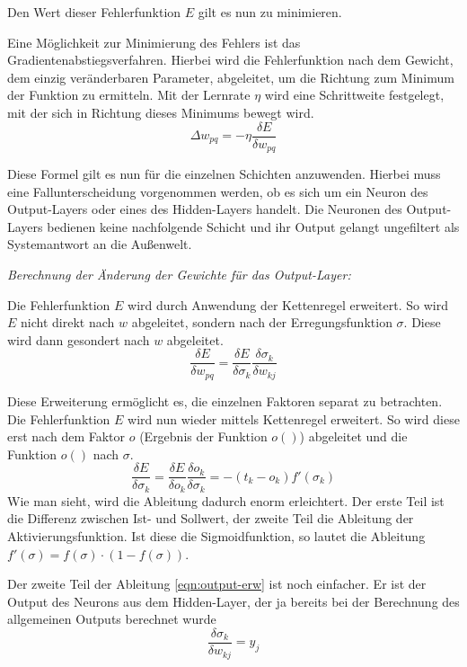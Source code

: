 Den Wert dieser Fehlerfunktion $E$ gilt es nun zu minimieren.

Eine Möglichkeit zur Minimierung des Fehlers ist das Gradientenabstiegsverfahren. Hierbei wird die Fehlerfunktion nach dem Gewicht, dem einzig veränderbaren Parameter, abgeleitet, um die Richtung zum Minimum der Funktion zu ermitteln. Mit der Lernrate $\eta$ wird eine Schrittweite festgelegt, mit der sich in Richtung dieses Minimums bewegt wird.
\begin{equation}
\Delta w_{pq}=-\eta \frac{\delta E}{\delta w_{pq}}
\end{equation}

Diese Formel gilt es nun für die einzelnen Schichten anzuwenden. Hierbei muss eine Fall\-unter\-scheidung vorgenommen werden, ob es sich um ein Neuron des Output-Layers oder eines des Hidden-Layers handelt. Die Neuronen des Output-Layers bedienen keine nachfolgende Schicht und ihr Output gelangt ungefiltert als Systemantwort an die Außenwelt.

\emph{Berechnung der Änderung der Gewichte für das Output-Layer:}

Die Fehlerfunktion $E$ wird durch Anwendung der Kettenregel erweitert. So wird $E$ nicht direkt nach $w$ abgeleitet, sondern nach der Erregungsfunktion $\sigma$. Diese wird dann gesondert nach $w$ abgeleitet.
\begin{equation}
\frac{\delta E}{\delta w_{pq}} = \frac{\delta E}{\delta \sigma_{k}} \frac{\delta \sigma_{k}}{\delta w_{kj}}
\label{eqn:output-erw}
\end{equation}

Diese Erweiterung ermöglicht es, die einzelnen Faktoren separat zu betrachten. Die Fehlerfunktion $E$ wird nun wieder mittels Kettenregel erweitert. So wird diese erst nach dem Faktor $o$ (Ergebnis der Funktion $o()$) abgeleitet und die Funktion $o()$ nach $\sigma$.
\begin{equation}
\frac{\delta E}{\delta \sigma_{k}} = \frac{\delta E}{\delta o_{k}} \frac{\delta o_k}{\delta \sigma_k} = -(t_k - o_k) f'(\sigma_k)
\end{equation}
Wie man sieht, wird die Ableitung dadurch enorm erleichtert. Der erste Teil ist die Differenz zwischen Ist- und Sollwert, der zweite Teil die Ableitung der Aktivierungsfunktion. Ist diese die Sigmoidfunktion, so lautet die Ableitung $f'(\sigma)=f(\sigma)\cdot (1-f(\sigma))$.

Der zweite Teil der Ableitung \ref{eqn:output-erw} ist noch einfacher. Er ist der Output des Neurons aus dem Hidden-Layer, der ja bereits bei der Berechnung des allgemeinen Outputs berechnet wurde
\begin{equation}
\frac{\delta\sigma_k}{\delta w_{kj}}=y_j
\end{equation}

